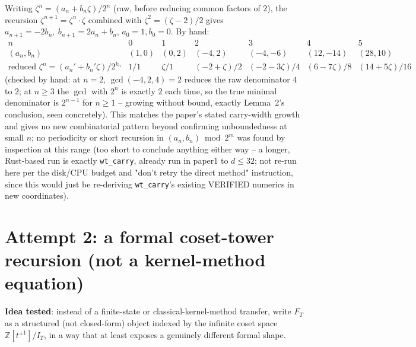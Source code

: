 \documentclass[11pt]{article}
\newcommand{\Z}{\mathbb Z}
\begin{document}
Writing $\zeta^n=(a_n+b_n\zeta)/2^n$ (raw, before reducing common factors of $2$), the recursion
$\zeta^{n+1}=\zeta^n\cdot\zeta$ combined with $\zeta^2=(\zeta-2)/2$ gives
$a_{n+1}=-2b_n,\ b_{n+1}=2a_n+b_n$, $a_0=1,b_0=0$. By hand:
\[
\begin{array}{c|rrrrr}
n & 0&1&2&3&4&5\\\hline
(a_n,b_n) & (1,0)&(0,2)&(-4,2)&(-4,-6)&(12,-14)&(28,10)\\
\text{reduced }\zeta^n=(a_n'+b_n'\zeta)/2^{k_n}& 1/1 & \zeta/1 & (-2+\zeta)/2 & (-2-3\zeta)/4 &
(6-7\zeta)/8 & (14+5\zeta)/16
\end{array}
\]
(checked by hand: at $n=2$, $\gcd(-4,2,4)=2$ reduces the raw denominator $4$ to $2$; at
$n\ge3$ the $\gcd$ with $2^n$ is exactly $2$ each time, so the true minimal denominator is
$2^{n-1}$ for $n\ge1$ -- growing without bound, exactly Lemma~2's conclusion, seen concretely).
This matches the paper's stated carry-width growth and gives no new combinatorial pattern beyond
confirming unboundedness at small $n$; no periodicity or short recursion in $(a_n,b_n)\bmod 2^m$
was found by inspection at this range (too short to conclude anything either way -- a longer,
Rust-based run is exactly \texttt{wt\_carry}, already run in paper1 to $d\le32$; not re-run here per
the disk/CPU budget and "don't retry the direct method" instruction, since this would just be
re-deriving \texttt{wt\_carry}'s existing VERIFIED numerics in new coordinates).

\section{Attempt 2: a formal coset-tower recursion (not a kernel-method equation)}

\textbf{Idea tested}: instead of a finite-state or classical-kernel-method transfer, write $F_T$
as a structured (not closed-form) object indexed by the infinite coset space
$\Z[t^{\pm1}]/I_T$, in a way that at least exposes a genuinely different formal shape.
\end{document}
